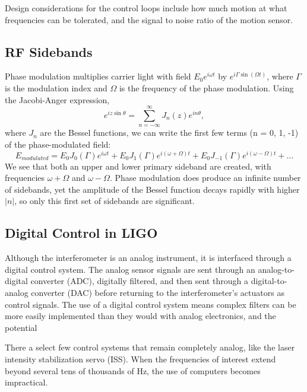 Design considerations for the control loops include how much motion at
what frequencies can be tolerated, and the signal to noise ratio of
the motion sensor.


\subsection{RF Sidebands}
Phase modulation multiplies carrier light with field
$E_0e^{i\omega t}$ by $e^{i \Gamma \sin{(\Omega t)}}$, where $\Gamma$
is the modulation index and $\Omega$ is the frequency of the phase
modulation. Using the Jacobi-Anger expression,
\begin{equation}
e^{i z \sin{\theta}} = \sum_{n=-\infty}^{\infty} J_n(z) e^{i n \theta},
\end{equation}
where $J_n$ are the Bessel functions, we can write the first few terms
(n = 0, 1, -1) of the phase-modulated field:
\begin{equation}
E_{modulated} = E_0 J_0(\Gamma) e^{i\omega t} + E_0 J_1(\Gamma)
e^{i(\omega + \Omega) t} + E_0 J_{-1}(\Gamma)
e^{i(\omega - \Omega) t} + ...
\end{equation}
We see that both an upper and lower primary sideband are created, with
frequencies $\omega + \Omega$ and $\omega - \Omega$. Phase modulation
does produce an infinite number of sidebands, yet the amplitude of the
Bessel function decays rapidly with higher $|n|$, so only this first
set of sidebands are significant.




\subsection{Digital Control in LIGO}
Although the interferometer is an analog instrument, it is interfaced
through a digital control system. The analog sensor signals are sent
through an analog-to-digital converter (ADC), digitally filtered, and
then sent through a digital-to-analog converter (DAC) before returning
to the interferometer's actuators as control signals. The use of a digital
control system means complex filters can be more easily implemented
than they would with analog electronics, and the potential 

There a select few control systems that remain completely analog, like
the laser intensity stabilization servo (ISS). When the frequencies of
interest extend beyond several tens of thousands of Hz, the use of
computers becomes impractical.




